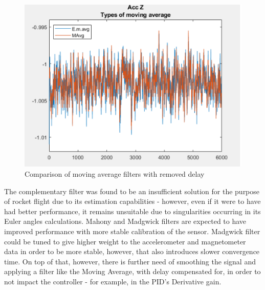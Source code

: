 \begin{figure}[H]
  \centering
  \includegraphics[scale=0.9]{graphics/accznodelay.png}
  \caption{Comparison of moving average filters with removed delay}
  \label{movingaveragenodelay}
\end{figure}

The complementary filter was found to be an insufficient solution for the purpose of rocket flight due to its estimation capabilities - however, even if it were to have had better performance, it remains unsuitable due to singularities occurring in its Euler angles calculations. Mahony and Madgwick filters are expected to have improved performance with more stable calibration of the sensor. Madgwick filter could be tuned to give higher weight to the accelerometer and magnetometer data in order to be more stable, however, that also introduces slower convergence time. 
On top of that, however, there is further need of smoothing the signal and applying a filter like the Moving Average, with delay compensated for, in order to not impact the controller - for example, in the PID's Derivative gain. 

